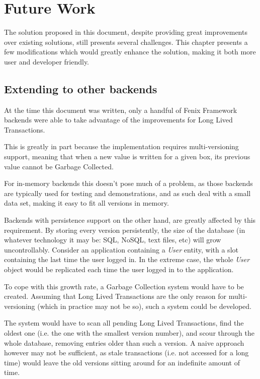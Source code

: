 \chapter{Future Work}

The solution proposed in this document, despite providing great
improvements over existing solutions, still presents several
challenges. This chapter presents a few modifications which would
greatly enhance the solution, making it both more user and developer
friendly. 

\section{Extending to other backends}

At the time this document was written, only a handful of Fenix
Framework backends were able to take advantage of the improvements for
Long Lived Transactions.

This is greatly in part because the implementation requires
multi-versioning support, meaning that when a new value is written for
a given box, its previous value cannot be Garbage Collected. 

For in-memory backends this doesn't pose much of a problem, as those
backends are typically used for testing and demonstrations, and as
such deal with a small data set, making it easy to fit all versions in
memory. 

Backends with persistence support on the other hand, are greatly
affected by this requirement. By storing every version persistently,
the size of the database (in whatever technology it may be: SQL,
NoSQL, text files, etc) will grow uncontrollably. Consider an
application containing a {\it User} entity, with a slot containing the
last time the user logged in. In the extreme case, the whole {\it
  User} object would be replicated each time the user logged in to the
application.

To cope with this growth rate, a Garbage Collection system would have
to be created. Assuming that Long Lived Transactions are the only
reason for multi-versioning (which in practice may not be so), such a
system could be developed.

The system would have to scan all pending Long Lived Transactions,
find the oldest one (i.e. the one with the smallest version number),
and scour through the whole database, removing entries older than such
a version. A naive approach however may not be sufficient, as stale
transactions (i.e. not accessed for a long time) would leave the old
versions sitting around for an indefinite amount of time.

